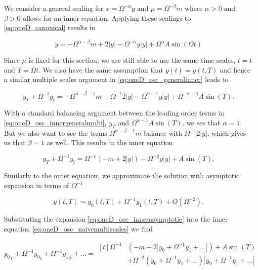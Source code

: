We consider a general scaling for $x=\Omega^{-\alpha}y$ and $\mu = \Omega^{-\beta}m$ where $\alpha>0$ and $\beta>0$ allows for an inner equation. Applying these scalings to \eqref{eq:oneD_canonical} results in

\begin{equation}\label{eq:oneD_osc_generalinner}
\dot{y} = -\Omega^{\alpha-\beta}m+2|y|-\Omega^{-\alpha}y|y|+\Omega^{\alpha}A\sin(\Omega t)
\end{equation}

Since $\mu$ is fixed for this section, we are still able to use the same time scales, $t=t$ and $T=\Omega t$. We also have the same assumption that $y(t)=y(t,T)$ and hence a similar multiple scales argument in \eqref{eq:oneD_osc_generalinner} leads to

\begin{equation}\label{eq:oneD_osc_innergeneralmulti}
y_T+\Omega^{-1}y_t = - \Omega^{\alpha-\beta-1}m+\Omega^{-1}2|y|-\Omega^{\alpha-1}y|y|+\Omega^{-\alpha-1}A\sin(T).
\end{equation}

With a standard balancing argument between the leading order terms in \eqref{eq:oneD_osc_innergeneralmulti}, $y_T$ and $\Omega^{\alpha-1} A\sin(T)$, we see that $\alpha=1$. But we also want to see the terms $\Omega^{\alpha-\beta-1}m$ balance with $\Omega^{-1}2|y|$, which gives us that $\beta=1$ as well. This results in the inner equation

\begin{equation}\label{eq:oneD_osc_naivemultiscales}
y_T+\Omega^{-1}y_t = \Omega^{-1}\left(-m+2|y|\right)-\Omega^{-2}y|y|+A\sin(T).
\end{equation}

Similarly to the outer equation, we approximate the solution with asymptotic expansion in terms of $\Omega^{-1}$ 

\begin{equation}\label{eq:oneD_osc_innerasymptotic}
y(t,T)\sim y_0(t,T)+\Omega^{-1}y_1(t,T)+O(\Omega^{-2}).
\end{equation}

Substituting the expansion \eqref{eq:oneD_osc_innerasymptotic} into the inner equation \eqref{eq:oneD_osc_naivemultiscales} we find

\begin{equation*}
{y_0}_T+\Omega^{-1}{y_0}_t+\Omega^{-1}{y_1}_T+\ldots =\begin{aligned}[t]\Omega^{-1}&(-m+2|y_0+\Omega^{-1}y_1+\ldots|)+A\sin(T)\\
&+\Omega^{-2}(y_0+\Omega^{-1}y_1+\ldots)|y_0+\Omega^{-1}y_1+\ldots|
\end{aligned}
\end{equation*}

